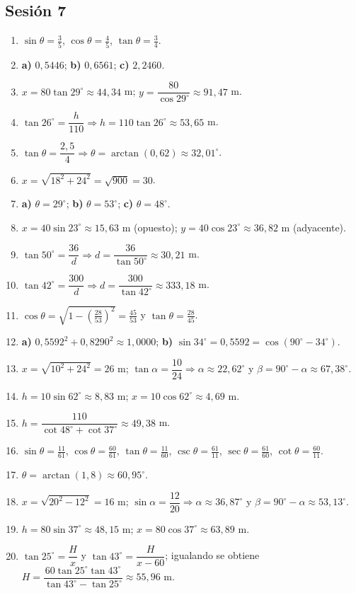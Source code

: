 \documentclass[12pt, letterpaper]{article}
\providecommand{\sen}{\sin}
\begin{document}
\subsection*{Sesión 7}
\begin{enumerate}[leftmargin=*, label=\textbf{\arabic*.}]
  \item $\sen\theta=\frac{3}{5}$, $\cos\theta=\frac{4}{5}$, $\tan\theta=\frac{3}{4}$.
  \item \textbf{a)} $0{,}5446$; \quad \textbf{b)} $0{,}6561$; \quad \textbf{c)} $2{,}2460$.
  \item $x=80\tan 29^{\circ}\approx 44{,}34$ m; $y=\dfrac{80}{\cos 29^{\circ}}\approx 91{,}47$ m.
  \item $\tan 26^{\circ}=\dfrac{h}{110}\Rightarrow h=110\tan 26^{\circ}\approx 53{,}65$ m.
  \item $\tan\theta=\dfrac{2{,}5}{4}\Rightarrow\theta=\arctan\left(0{,}62\right)\approx 32{,}01^{\circ}$.
  \item $x=\sqrt{18^2+24^2}=\sqrt{900}=30$.
  \item \textbf{a)} $\theta=29^{\circ}$; \quad \textbf{b)} $\theta=53^{\circ}$; \quad \textbf{c)} $\theta=48^{\circ}$.
  \item $x=40\sen 23^{\circ}\approx 15{,}63$ m (opuesto); $y=40\cos 23^{\circ}\approx 36{,}82$ m (adyacente).
  \item $\tan 50^{\circ}=\dfrac{36}{d}\Rightarrow d=\dfrac{36}{\tan 50^{\circ}}\approx 30{,}21$ m.
  \item $\tan 42^{\circ}=\dfrac{300}{d}\Rightarrow d=\dfrac{300}{\tan 42^{\circ}}\approx 333{,}18$ m.
  \item $\cos\theta=\sqrt{1-\left(\frac{28}{53}\right)^2}=\frac{45}{53}$ y $\tan\theta=\frac{28}{45}$.
  \item \textbf{a)} $0{,}5592^2+0{,}8290^2\approx 1{,}0000$; \quad \textbf{b)} $\sen 34^{\circ}=0{,}5592=\cos(90^{\circ}-34^{\circ})$. \checkmark
  \item $x=\sqrt{10^2+24^2}=26$ m; $\tan\alpha=\dfrac{10}{24}\Rightarrow\alpha\approx 22{,}62^{\circ}$ y $\beta=90^{\circ}-\alpha\approx 67{,}38^{\circ}$.
  \item $h=10\sen 62^{\circ}\approx 8{,}83$ m; $x=10\cos 62^{\circ}\approx 4{,}69$ m.
  \item $h=\dfrac{110}{\cot 48^{\circ}+\cot 37^{\circ}}\approx 49{,}38$ m.
  \item $\sen\theta=\frac{11}{61}$, $\cos\theta=\frac{60}{61}$, $\tan\theta=\frac{11}{60}$, $\csc\theta=\frac{61}{11}$, $\sec\theta=\frac{61}{60}$, $\cot\theta=\frac{60}{11}$.
  \item $\theta=\arctan\left(1{,}8\right)\approx 60{,}95^{\circ}$.
  \item $x=\sqrt{20^2-12^2}=16$ m; $\sen\alpha=\dfrac{12}{20}\Rightarrow\alpha\approx 36{,}87^{\circ}$ y $\beta=90^{\circ}-\alpha\approx 53{,}13^{\circ}$.
  \item $h=80\sen 37^{\circ}\approx 48{,}15$ m; $x=80\cos 37^{\circ}\approx 63{,}89$ m.
  \item $\tan 25^{\circ}=\dfrac{H}{x}$ y $\tan 43^{\circ}=\dfrac{H}{x-60}$; igualando se obtiene $H=\dfrac{60\tan 25^{\circ}\tan 43^{\circ}}{\tan 43^{\circ}-\tan 25^{\circ}}\approx 55{,}96$ m.
\end{enumerate}
\end{document}
